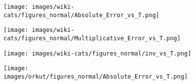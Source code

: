 \begin{figure*}[htbp]
\begin{subfigure}[b]{\textwidth}
	\end{subfigure}
\begin{subfigure}[b]{\textwidth}
	\centering
	\begin{minipage}[b]{0.05\textwidth}
		\centering
	\end{minipage}%
	\begin{minipage}[b]{0.3\textwidth}
		\centering
		\texttt{[image: images/wiki-cats/figures\_normal/Absolute\_Error\_vs\_T.png]} %
		
	\end{minipage}%
	\begin{minipage}[b]{0.3\textwidth}
		\centering
		
		\texttt{[image: images/wiki-cats/figures\_normal/Multiplicative\_Error\_vs\_T.png]} %
		
	\end{minipage}%
	\begin{minipage}[b]{0.3\textwidth}
		\centering
		
		\texttt{[image: images/wiki-cats/figures\_normal/inv\_vs\_T.png]} %
	\end{minipage}
\end{subfigure}

\begin{subfigure}[b]{\textwidth}
	\centering
	\begin{minipage}[b]{0.05\textwidth}
		\centering
	\end{minipage}%
	\begin{minipage}[b]{0.3\textwidth}
		\centering
		\texttt{[image: images/orkut/figures\_normal/Absolute\_Error\_vs\_T.png]} %
		

\end{minipage}
\end{subfigure}
\end{figure*}

